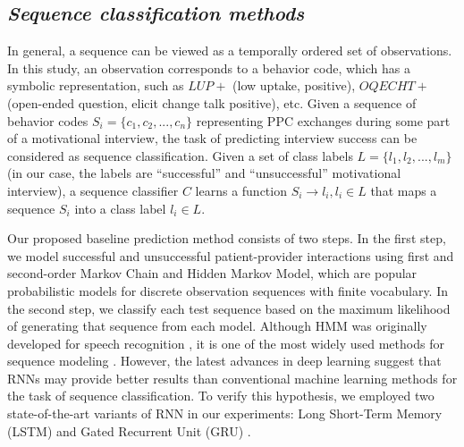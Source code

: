 \documentclass{amia_summit_2018}
\begin{document}

\subsection*{\textit{Sequence classification methods}}
In general, a sequence can be viewed as a temporally ordered set of observations. In this study, an observation corresponds to a behavior code, which has a symbolic representation, such as $LUP+$ (low uptake, positive),
$OQECHT+$ (open-ended question, elicit change talk positive), etc.  Given a sequence of behavior codes $S_i = \{c_1, c_2,...,c_n\}$ representing PPC exchanges during some part of a motivational interview, the task of predicting interview success can be considered as sequence classification. Given a set of class labels $L = \{l_1, l_2,...,l_m\}$ (in our case, the labels are
``successful'' and ``unsuccessful'' motivational interview), a sequence classifier $C$ learns a function $S_i \to l_i, l_i \in L$ that maps a sequence $S_i$ into a class label $l_i \in L$.

Our proposed baseline prediction method consists of two steps. In the first step, we model successful and unsuccessful patient-provider interactions using first and second-order Markov Chain and
Hidden Markov Model, which are popular probabilistic models for discrete observation sequences with finite vocabulary. In the second step, we classify each test sequence based on the maximum
likelihood of generating that sequence from each model. Although HMM was originally developed for speech recognition \cite{rabiner1989tutorial}, it is one of the most widely used methods for sequence
modeling \cite{mutsam2016maximum, won2004training}. However, the latest advances in deep learning suggest that RNNs may provide better results than conventional machine learning methods for the task of
sequence classification. To verify this hypothesis, we employed two state-of-the-art variants of RNN in our experiments: Long Short-Term Memory (LSTM) \cite{hochreiter1997long} and Gated Recurrent Unit (GRU) \cite{chung2014empirical}.
\end{document}
